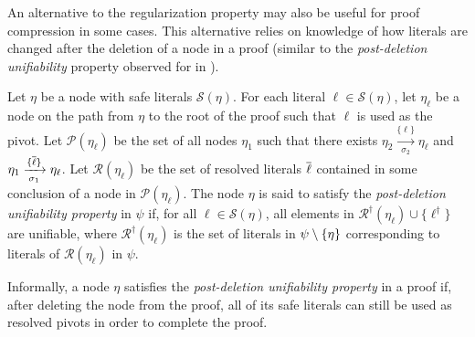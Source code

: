 An alternative to the regularization property may also be useful for proof compression in some cases. This alternative relies on knowledge of how literals are changed after the deletion of a node in a proof (similar to the \emph{post-deletion unifiability} property observed for {\FOLowerUnits} in \cite{GFOLU}).  
\begin{definition}
Let $\eta$ be a node with safe literals $\mathcal{S}(\eta)$.
For each literal $\ell \in \mathcal{S}(\eta)$, let $\eta_\ell$ be a node on the path from $\eta$ to the root of the proof such that $\ell$ is used as the pivot.
Let $\mathcal{P}(\eta_\ell)$ be the set of all nodes $\eta_1$ such that there exists $\eta_2 \xrightarrow[\sigma_2]{\{\ell\} } \eta_\ell$ and $\eta_1 \xrightarrow[\sigma_1]{\{\overline{\ell}\} } \eta_\ell$.
Let $\mathcal{R}(\eta_\ell)$ be the set of resolved literals $\overline{\ell}$ contained in some conclusion of a node in $\mathcal{P}(\eta_\ell)$.
The node $\eta$ is said to satisfy the \emph{post-deletion unifiability property} in $\psi$ if, for all $\ell \in \mathcal{S}(\eta)$, all elements in $\mathcal{R}^{\dagger}(\eta_\ell) \cup \{\ell^{\dagger}\}$ are unifiable, where $\mathcal{R}^{\dagger}(\eta_\ell)$ is the set of literals in $\psi \setminus \{\eta\}$ corresponding to literals of $\mathcal{R}(\eta_\ell)$ in $\psi$.
\end{definition}



Informally, a node $\eta$ satisfies the \emph{post-deletion unifiability property} in a proof if, after deleting the node from the proof, all of its safe literals can still be used as resolved pivots in order to complete the proof.

